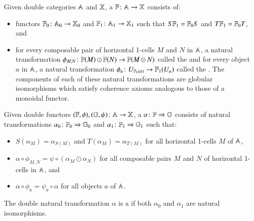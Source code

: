 \documentclass[reqno]{amsart}
\begin{document}
\begin{defn}\label{def:doublefun}
Given double categories $\mathbf{\mathbb A}$ and $\mathbf{\mathbb X}$, a  $\mathbf{\mathbb F} \colon\mathbf{\mathbb A} \to \mathbf{\mathbb X}$ consists of:
\begin{itemize}
\item{functors $\mathbf{\mathbb F}_0 \colon \mathbf{\mathbb A}_0 \to \mathbf{\mathbb X}_0$ and $\mathbf{\mathbb F}_1 \colon \mathbf{\mathbb A}_1 \to \mathbf{\mathbb X}_1$ such that $S \mathbf{\mathbb F}_1 = \mathbf{\mathbb F}_0 S$ and $T \mathbf{\mathbb F}_1 = \mathbf{\mathbb F}_0 T$, and}
\item{for every composable pair of horizontal 1-cells $M$ and $N$ in $\mathbf{\mathbb A}$, a natural transformation $\phi_{M,N} \colon \mathbf{\mathbb F}(M) \odot \mathbf{\mathbb F}(N) \to \mathbf{\mathbb F}(M \odot N)$ called the  and for every object $a$ in $\mathbf{\mathbb A}$, a natural transformation $\phi_a \colon U_{\mathbf{\mathbb F}_0(a)} \to \mathbf{\mathbb F}_1(U_a)$ called the . The components of each of these natural transformations are globular isomorphisms which satisfy coherence axioms analogous to those of a monoidal functor.}
\end{itemize}
\end{defn}

\begin{defn}
Given double functors $(\mathbf{\mathbb F},\phi),(\mathbb{G},\psi) \colon \mathbf{\mathbb A} \to \mathbf{\mathbb X}$, a  $\alpha \colon \mathbf{\mathbb F} \Rightarrow \mathbb{G}$ consists of natural transformations $\alpha_0 \colon \mathbf{\mathbb F}_0 \Rightarrow \mathbb{G}_0$ and $\alpha_1 \colon \mathbf{\mathbb F}_1 \Rightarrow \mathbb{G}_1$ such that:
\begin{itemize}
\item{$S(\alpha_M) = \alpha_{S(M)}$ and $T(\alpha_M) = \alpha_{T(M)}$ for all horizontal 1-cells $M$ of $\mathbf{\mathbb A}$,}
\item{$\alpha \circ \phi_{M,N} = \psi \circ (\alpha_M \odot \alpha_N)$ for all composable pairs $M$ and $N$ of horizontal 1-cells in $\mathbf{\mathbb A}$, and}
\item{$\alpha \circ \phi_a = \psi_a \circ \alpha$ for all objects $a$ of $\mathbf{\mathbb A}$.}
\end{itemize} 
The double natural transformation $\alpha$ is a  if both $\alpha_0$ and $\alpha_1$ are natural isomorphisms.
\end{defn}
\end{document}
